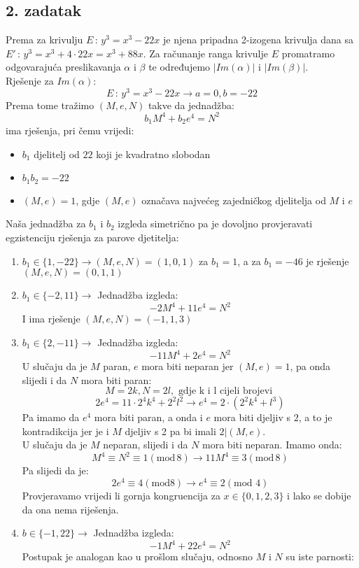 \documentclass[12pt, a4paper]{article}
\begin{document}
\begin{spacing}{1.5}
\subsection{2. zadatak}
Prema \cite[p.~38]{ekk} za krivulju $E \, : \, y^3=x^3-22x$ je njena pripadna 2-izogena krivulja dana sa $E' \, : \, y^3=x^3 + 4 \cdot 22 x=x^3 +88x$.
Za računanje ranga krivulje $E$ promatramo odgovarajuća preslikavanja $\alpha$ i $\beta$ te određujemo $|Im(\alpha)|$ i $|Im(\beta)|$.\\
Rješenje za $Im(\alpha)$:\\
\[E \, : \, y^3=x^3-22x \to a=0, b=-22\]
Prema tome tražimo $(M,e,N)$  takve da jednadžba:
\[b_1 M^4 + b_2 e^4=N^2\]
ima rješenja, pri čemu vrijedi:
\begin{itemize}
\item $b_1 $ djelitelj od $22$ koji je kvadratno slobodan
\item $b_1 b_2=-22$
\item $(M,e)=1$, gdje $(M,e)$ označava najvećeg zajedničkog djelitelja od $M$ i $e$
\end{itemize}
Naša jednadžba za $b_1$ i $b_2$ izgleda simetrično pa je dovoljno provjeravati egzistenciju rješenja za parove djetitelja:
\begin{enumerate}
\item $b_1 \in \{1,-22\} \to (M,e,N)=(1,0,1)$ za $b_1=1$, a za $b_1=-46$ je rješenje $(M,e,N)=(0,1,1)$
\item $b_1 \in \{-2, 11\} \to$ Jednadžba izgleda:
\[-2M^4 + 11e^4=N^2\]
I ima rješenje $(M,e,N)=(-1,1,3)$
\item $b_1 \in \{2,-11\} \to$ Jednadžba izgleda:
\[-11M^4+2e^4=N^2\] 
U slučaju da je $M$ paran, $e$ mora biti neparan jer $(M,e)=1$, pa onda slijedi i da $N$ mora biti paran:
\[M=2k, N=2l, \textrm{ gdje k i l cijeli brojevi }\]
\[2e^4=11 \cdot 2^4 k^4 + 2^2 l^2 \to e^4=2\cdot (2^2 k^4 + l^3)\]
Pa imamo da $e^4$ mora biti paran, a onda i $e$ mora biti djeljiv s $2$, a to je kontradikcija  jer je i $M$ djeljiv s 2 pa bi imali $2|(M,e)$.\\
U slučaju da je $M$ neparan, slijedi i da $N$ mora biti neparan. 
Imamo onda:
\[M^4 \equiv N^2 \equiv 1 (\textrm{mod} \, 8) \to 11M^4 \equiv 3 (\textrm{mod} \, 8)\]
Pa slijedi da je:
\[2e^4\equiv 4 (\textrm{mod} 8) \to e^4\equiv 2 (\textrm{mod } 4)\]
Provjeravamo vrijedi li gornja kongruencija za $x \in \{0,1,2,3\}$ i lako se dobije da ona nema riješenja.
\item $b \in \{-1, 22\} \to$ Jednadžba izgleda:
\[-1M^4+22e^4=N^2\]
Postupak je analogan kao u prošlom slučaju, odnosno $M$ i $N$ su iste parnosti:

\end{enumerate}
\end{spacing}
\end{document}
